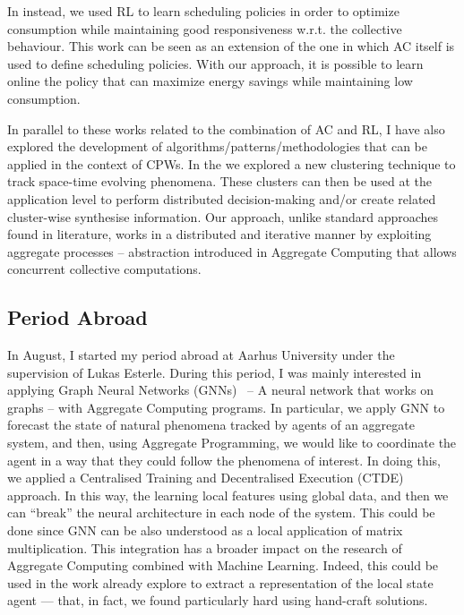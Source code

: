 \documentclass[11pt]{article}
\begin{document}
In \textit{} instead, 
 we used RL to learn scheduling policies 
 in order to optimize consumption 
 while maintaining good responsiveness w.r.t. the collective behaviour.  
This work can be seen as an extension of the one \textit{} 
 in which AC itself is used to define scheduling policies. 
With our approach, it is possible 
 to learn online the policy that can 
 maximize energy savings while maintaining low consumption.

In parallel to these works related to the combination of AC and RL, 
 I have also explored the development of algorithms/patterns/methodologies 
 that can be applied in the context of CPWs.
%
In the \textit{} 
 we explored a new clustering technique to track space-time evolving phenomena. 
% 
These clusters can then be used at the application level to perform 
 distributed decision-making and/or create related cluster-wise synthesise information.
Our approach, unlike standard approaches found in literature, 
 works in a distributed and iterative manner by exploiting 
 aggregate processes -- abstraction introduced in Aggregate Computing 
 that allows concurrent collective computations.

\subsection{Period Abroad}
In August, I started my period abroad 
 at Aarhus University under the supervision of Lukas Esterle.
%
During this period, I was mainly interested in applying Graph Neural Networks (GNNs)~\cite{scarselli2008graph}
 -- A neural network that works on graphs -- 
 with Aggregate Computing programs.
%
In particular, we apply GNN to forecast 
 the state of natural phenomena tracked by agents of an aggregate system, and then, 
 using Aggregate Programming, we would like to coordinate the agent in a way 
 that they could follow the phenomena of interest.
%
In doing this, we applied a Centralised Training and Decentralised Execution (CTDE)~\cite{foerster2018deep} approach. 
%
In this way, the learning local features using global data, 
 and then we can ``break'' the neural architecture in each node of the system.
%
This could be done since GNN can be also understood as a local application of matrix multiplication.
%
This integration has a broader impact on the research of Aggregate Computing combined with Machine Learning. 
%
Indeed, this could be used in the work already 
 explore to extract a representation of the local state agent 
 --- that, in fact, we found particularly hard using hand-craft solutions. 
\end{document}

